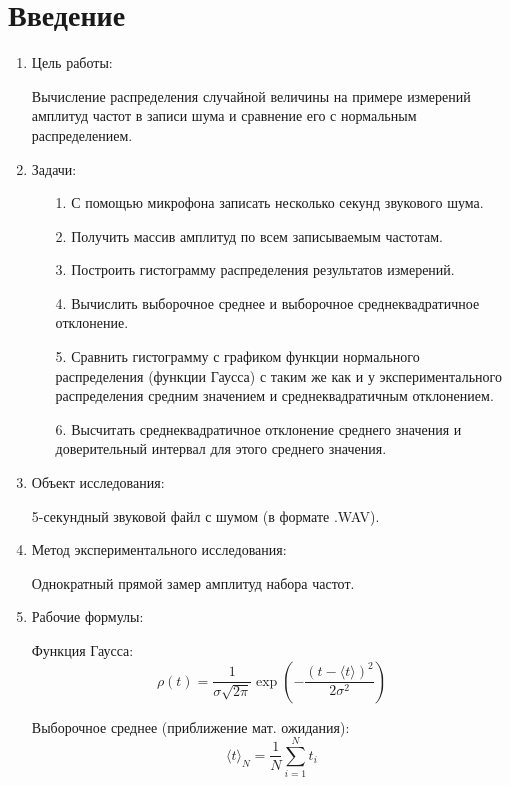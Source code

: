 \documentclass[12pt, a4paper]{article}
\begin{document}
\section{Введение}
\begin{enumerate}
\item Цель работы:

Вычисление распределения случайной величины на примере измерений амплитуд частот в записи шума и сравнение его с нормальным распределением.

\item Задачи:
	\begin{enumerate}
		\item[1.]  С помощью микрофона записать несколько секунд звукового шума.
		\item[2.] Получить массив амплитуд по всем записываемым частотам.
		\item[3.] Построить гистограмму распределения результатов измерений.
		\item[4.] Вычислить выборочное среднее и выборочное среднеквадратичное отклонение.
		\item[5.] Сравнить гистограмму с графиком функции нормального распределения (функции Гаусса) с таким же как и у экспериментального распределения средним значением и среднеквадратичным отклонением.
		\item[6.] Высчитать среднеквадратичное отклонение среднего значения и доверительный интервал для  этого среднего значения.
	\end{enumerate}
		
\item Объект исследования:

5-секундный звуковой файл с шумом (в формате .WAV).

\item Метод экспериментального исследования:

Однократный прямой замер амплитуд набора частот.

\item Рабочие формулы:

Функция Гаусса:
\begin{equation}
 \rho (t) = \frac{1}{\sigma \sqrt{2\pi}}\exp\left( -\frac{(t-\langle t \rangle)^2}{2 \sigma^2}\right)
\end{equation}

Выборочное среднее (приближение мат. ожидания):
\begin{equation}
\langle t \rangle_N = \frac{1}{N} \sum^N_{i=1} t_i
\end{equation}


\end{enumerate}
\end{document}
